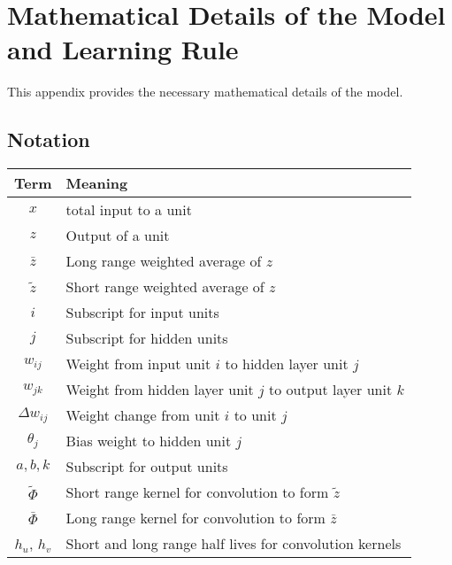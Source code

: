 \documentclass[a4paper]{article}
\newcommand{\zbar}{\bar{z}}
\newcommand{\ztilde}{\tilde{z}}
\newcommand{\lkernel}{\bar{\Phi}}
\newcommand{\skernel}{\tilde{\Phi}}
\begin{document}


\appendix

\section{Mathematical Details of the Model and Learning Rule}
\label{sec:learningruleapp}
This appendix provides the necessary mathematical details of the
model.

\label{maths.app}

\subsection{Notation}

\begin{center}
  

\begin{tabular}{cp{8cm}}
  Term & Meaning \\ \hline
  $x$ & total input to a unit \\
  $z$ & Output of a unit \\
  $\zbar$ & Long range weighted average of $z$ \\
  $\ztilde$ & Short range weighted average of $z$ \\
  $i$ & Subscript for input units \\
  $j$ & Subscript for hidden units \\
  $w_{ij}$ & Weight from  input unit $i$ to hidden layer unit $j$\\
  $w_{jk}$ & Weight from  hidden layer unit $j$ to output layer unit
  $k$\\
  $\Delta w_{ij}$ & Weight change from unit $i$ to unit $j$ \\
  $\theta_j$ & Bias weight to hidden unit $j$ \\
  $a,b,k$ & Subscript for output units \\
  $\skernel$ & Short range kernel for convolution to form $\ztilde$\\
  $\lkernel$ & Long range kernel for convolution to form $\zbar$\\
  $h_u$, $h_v$ & Short and long range half lives for convolution kernels\\

\end{tabular}
\end{center}
\end{document}

